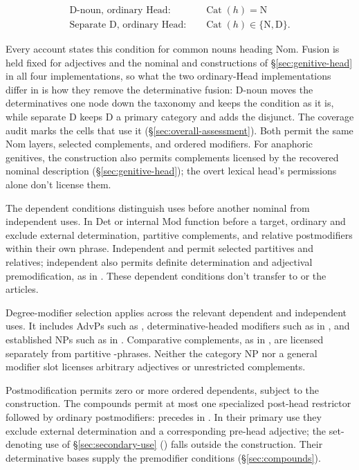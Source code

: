 \documentclass[12pt]{article}
\begin{document}
\[
\begin{aligned}
\text{D-noun, ordinary Head:} &\quad \operatorname{Cat}(h)=\mathrm{N} \\
\text{Separate D, ordinary Head:} &\quad \operatorname{Cat}(h)\in\{\mathrm{N},\mathrm{D}\}.
\end{aligned}
\]

Every account states this condition for common nouns heading Nom. Fusion is held fixed for adjectives and the nominal  and  constructions of §\ref{sec:genitive-head} in all four implementations, so what the two ordinary-Head implementations differ in is how they remove the determinative fusion: D-noun moves the determinatives one node down the taxonomy and keeps the condition as it is, while separate D keeps D a primary category and adds the disjunct. The coverage audit marks the cells that use it (§\ref{sec:overall-assessment}). Both permit the same Nom layers, selected complements, and ordered modifiers. For anaphoric genitives, the construction also permits complements licensed by the recovered nominal description (§\ref{sec:genitive-head}); the overt lexical head's permissions alone don't license them.

The dependent conditions distinguish uses before another nominal from independent uses. In Det or internal Mod function before a target, ordinary  and  exclude external determination, partitive complements, and relative postmodifiers within their own phrase. Independent  and  permit selected partitives and relatives; independent  also permits definite determination and adjectival premodification, as in . These dependent conditions don't transfer to  or the articles.

Degree-modifier selection applies across the relevant dependent and independent uses. It includes AdvPs such as , determinative-headed modifiers such as  in , and established NPs such as  in . Comparative complements, as in , are licensed separately from partitive -phrases. Neither the category NP nor a general modifier slot licenses arbitrary adjectives or unrestricted complements.

Postmodification permits zero or more ordered dependents, subject to the construction. The compounds permit at most one specialized post-head restrictor followed by ordinary postmodifiers:  precedes  in . In their primary use they exclude external determination and a corresponding pre-head adjective; the set-denoting use of §\ref{sec:secondary-use} () falls outside the construction. Their determinative bases supply the premodifier conditions (§\ref{sec:compounds}).
\end{document}

